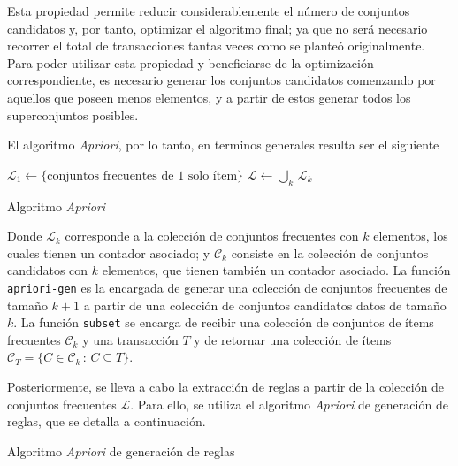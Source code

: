 Esta propiedad permite reducir considerablemente el número de conjuntos candidatos y, por tanto, optimizar el algoritmo final; ya que no será necesario recorrer el total de transacciones tantas veces como se planteó originalmente. Para poder utilizar esta propiedad y beneficiarse de la optimización correspondiente, es necesario generar los conjuntos candidatos comenzando por aquellos que poseen menos elementos, y a partir de estos generar todos los superconjuntos posibles.

El algoritmo \textit{Apriori}, por lo tanto, en terminos generales resulta ser el siguiente

\begin{algorithm}[H]
\DontPrintSemicolon
{}
$\mathcal{L}_1 \leftarrow \{\text{conjuntos frecuentes de 1 solo ítem}\}$\;
$\mathcal{L} \leftarrow \bigcup_k \, \mathcal{L}_k$\;
\caption{Algoritmo \textit{Apriori}}
\end{algorithm}

Donde $\mathcal{L}_k$ corresponde a la colección de conjuntos frecuentes con $k$ elementos, los cuales tienen un contador asociado; y $\mathcal{C}_k$ consiste en la colección de conjuntos candidatos con $k$ elementos, que tienen también un contador asociado. La función \texttt{apriori-gen} es la encargada de generar una colección de conjuntos frecuentes de tamaño $k+1$ a partir de una colección de conjuntos candidatos datos de tamaño $k$. La función \texttt{subset} se encarga de recibir una colección de conjuntos de ítems frecuentes $\mathcal{C}_k$ y una transacción $T$ y de retornar una colección de ítems $\mathcal{C}_T = \{C \in \mathcal{C}_k \, : \, C \subseteq T\}$.

Posteriormente, se lleva a cabo la extracción de reglas a partir de la colección de conjuntos frecuentes $\mathcal{L}$. Para ello, se utiliza el algoritmo \textit{Apriori} de generación de reglas, que se detalla a continuación.

\begin{algorithm}[H]
\DontPrintSemicolon
{}
\caption{Algoritmo \textit{Apriori} de generación de reglas}
\end{algorithm}

